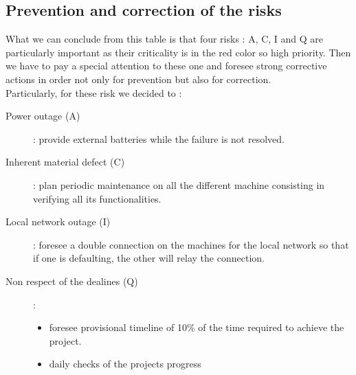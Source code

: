 \subsection{Prevention and correction of the risks}

What we can conclude from this table is that four risks : A, C, I and Q are particularly important as their criticality is in the red color so high priority.
Then we have to pay a special attention to these one and foresee strong corrective actions in order not only for prevention but also for correction.\\

Particularly, for these risk we decided to :
\begin{description}
    \item[Power outage (A)]: provide external batteries while the failure is not resolved.
    \item[Inherent material defect (C)]: plan periodic maintenance on all the different machine consisting in verifying all its functionalities.
    \item[Local network outage (I)]: foresee a double connection on the machines for the local network so that if one is defaulting, the other will relay the connection.
    \item[Non respect of the dealines (Q)]: 
    \begin{itemize}
        \item foresee provisional timeline of 10\% of the time required to achieve the project.
        \item daily checks of the projects progress
    \end{itemize}
\end{description}